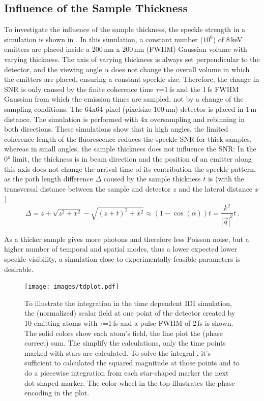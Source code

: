 \subsection{Influence of the Sample Thickness}
To investigate the influence of the sample thickness, the speckle strength in a simulation is shown in . In this simulation, a constant number ($10^6$) of 8\,keV emitters are placed inside a 200\,nm x 200\,nm (FWHM) Gaussian volume with varying thickness.  The axis of varying thickness is always set perpendicular to the detector, and the viewing angle $\alpha$ does not change the overall volume in which the emitters are placed, ensuring a constant speckle size. Therefore, the change in SNR is only caused by the finite coherence time $\tau$=1\,fs and the 1\,fs FWHM Gaussian from which the emission times are sampled, not by a change of the sampling conditions. The 64x64 pixel (pixelsize 100\,um) detector is placed in 1\,m distance. The simulation is performed with 4x oversampling and rebinning in both directions.  
These simulations show that in high angles, the limited coherence length of the fluorescence reduces the speckle SNR for thick samples, whereas in small angles, the sample thickness does not influence the SNR: In the 0° limit, the thickness is in beam direction and the position of an emitter along this axis does not change the arrival time of its contribution the speckle pattern, as the path length difference $\Delta$ caused by the sample thickness $t$ is (with the transversal distance between the sample and detector $z$ and the lateral distance $x$)
\begin{equation}
	\Delta=z+\sqrt{z^2+x^2}-\sqrt{(z+t)^2+x^2} \approx(1-\cos (\alpha)) t=\frac{k^2}{\left|\vec{q}\right|^2}t \,.
\end{equation}


 As a thicker sample gives more photons and therefore less Poisson noise, but a higher number of temporal and spatial modes, thus a lower expected lower speckle visibility, a simulation close to experimentally feasible parameters is desirable.







\begin{figure}
	   \centering
		\texttt{[image: images/tdplot.pdf]}
	\caption[Integration in Time Dependent IDI Simulation]{To illustrate the integration in the time dependent IDI simulation, the (normalized) scalar field at one point of the detector created by 10 emitting atoms with $\tau$=1\,fs and a pulse FWHM of 2\,fs is shown. The solid colors show each atom's field, the line plot the (phase correct) sum. The simplify the calculations, only the time points marked with stars are calculated. To solve the integral , it's sufficient to calculated the squared magnitude at those points and to do a piecewise integration from each star-shaped marker the next dot-shaped marker. The color wheel in the top illustrates the phase encoding in the plot.}
	\label{fig:tdplot}
\end{figure}


